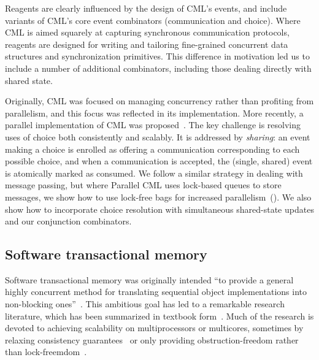 \documentclass[preprint]{sigplanconf}
\begin{document}
Reagents are clearly influenced by the design of CML's events, and include
variants of CML's core event combinators (communication and choice).  Where
CML is aimed squarely at capturing synchronous communication protocols,
reagents are designed for writing and tailoring fine-grained concurrent data
structures and synchronization primitives.  This difference in motivation led
us to include a number of additional combinators, including those dealing
directly with shared state.

Originally, CML was focused on managing concurrency rather than profiting from
parallelism, and this focus was reflected in its implementation.  More
recently, a parallel implementation of CML was proposed~\cite{Reppy2009}.  The
key challenge is resolving uses of choice both consistently and scalably.  It
is addressed by \emph{sharing}: an event making a choice is enrolled as
offering a communication corresponding to each possible choice, and when a
communication is accepted, the (single, shared) event is atomically marked as
consumed.  We follow a similar strategy in dealing with message passing, but
where Parallel CML uses lock-based queues to store messages, we show how to
use lock-free bags for increased parallelism~().  We
also show how to incorporate choice resolution with simultaneous shared-state
updates and our conjunction combinators.


\subsection{Software transactional memory}

Software transactional memory was originally intended ``to provide a general
highly concurrent method for translating sequential object implementations
into non-blocking ones''~\cite{Shavit1997}.  This ambitious goal has led to a
remarkable research literature, which has been summarized in textbook
form~\cite{Larus2006}.  Much of the research is devoted to achieving
scalability on multiprocessors or multicores, sometimes by relaxing
consistency guarantees~\cite{?} or only providing obstruction-freedom rather
than lock-freemdom~\cite{?}.  %
\end{document}
